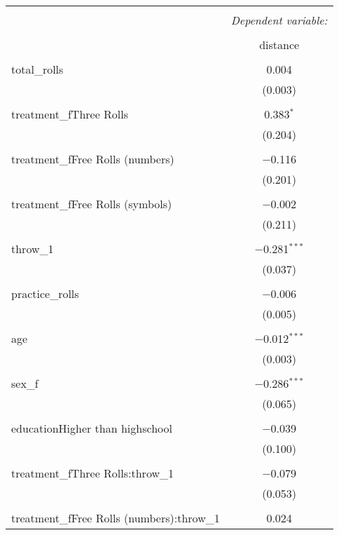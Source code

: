 
\begin{table}[!htbp] \centering 
  \caption{} 
  \label{} 
\begin{tabular}{@{\extracolsep{5pt}}lc} 
\\[-1.8ex]\hline 
\hline \\[-1.8ex] 
 & \multicolumn{1}{c}{\textit{Dependent variable:}} \\ 
\cline{2-2} 
\\[-1.8ex] & distance \\ 
\hline \\[-1.8ex] 
 total\_rolls & 0.004 \\ 
  & (0.003) \\ 
  & \\ 
 treatment\_fThree Rolls & 0.383$^{*}$ \\ 
  & (0.204) \\ 
  & \\ 
 treatment\_fFree Rolls (numbers) & $-$0.116 \\ 
  & (0.201) \\ 
  & \\ 
 treatment\_fFree Rolls (symbols) & $-$0.002 \\ 
  & (0.211) \\ 
  & \\ 
 throw\_1 & $-$0.281$^{***}$ \\ 
  & (0.037) \\ 
  & \\ 
 practice\_rolls & $-$0.006 \\ 
  & (0.005) \\ 
  & \\ 
 age & $-$0.012$^{***}$ \\ 
  & (0.003) \\ 
  & \\ 
 sex\_f & $-$0.286$^{***}$ \\ 
  & (0.065) \\ 
  & \\ 
 educationHigher than highschool & $-$0.039 \\ 
  & (0.100) \\ 
  & \\ 
 treatment\_fThree Rolls:throw\_1 & $-$0.079 \\ 
  & (0.053) \\ 
  & \\ 
 treatment\_fFree Rolls (numbers):throw\_1 & 0.024 \\ 

\end{tabular}
\end{table}
